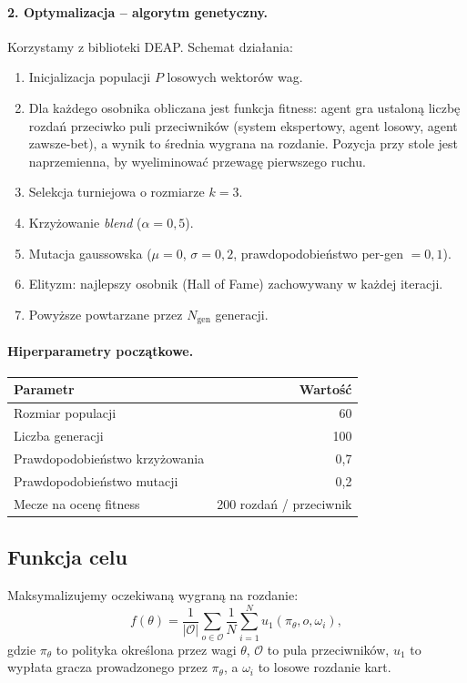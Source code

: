 \documentclass[12pt,a4paper]{article}
\begin{document}
\paragraph{2. Optymalizacja -- algorytm genetyczny.}
Korzystamy z biblioteki DEAP. Schemat działania:
\begin{enumerate}
    \item Inicjalizacja populacji $P$ losowych wektorów wag.
    \item Dla każdego osobnika obliczana jest funkcja fitness: agent
          gra ustaloną liczbę rozdań przeciwko puli przeciwników
          (system ekspertowy, agent losowy, agent zawsze-bet),
          a wynik to średnia wygrana na rozdanie. Pozycja przy stole
          jest naprzemienna, by wyeliminować przewagę pierwszego ruchu.
    \item Selekcja turniejowa o rozmiarze $k=3$.
    \item Krzyżowanie \emph{blend} ($\alpha=0{,}5$).
    \item Mutacja gaussowska ($\mu=0$, $\sigma=0{,}2$, prawdopodobieństwo per-gen $=0{,}1$).
    \item Elityzm: najlepszy osobnik (Hall of Fame) zachowywany w każdej iteracji.
    \item Powyższe powtarzane przez $N_\text{gen}$ generacji.
\end{enumerate}

\paragraph{Hiperparametry początkowe.}
\begin{center}
\begin{tabular}{lr}
\toprule
Parametr & Wartość \\ \midrule
Rozmiar populacji & 60 \\
Liczba generacji & 100 \\
Prawdopodobieństwo krzyżowania & 0{,}7 \\
Prawdopodobieństwo mutacji & 0{,}2 \\
Mecze na ocenę fitness & 200 rozdań / przeciwnik \\
\bottomrule
\end{tabular}
\end{center}

\subsection{Funkcja celu}
Maksymalizujemy oczekiwaną wygraną na rozdanie:
\[
f(\theta) = \frac{1}{|\mathcal{O}|}\sum_{o \in \mathcal{O}}
\frac{1}{N}\sum_{i=1}^{N} u_1\!\left(\pi_\theta, o, \omega_i\right),
\]
gdzie $\pi_\theta$ to polityka określona przez wagi $\theta$,
$\mathcal{O}$ to pula przeciwników, $u_1$ to wypłata gracza
prowadzonego przez $\pi_\theta$, a $\omega_i$ to losowe rozdanie kart.
\end{document}
